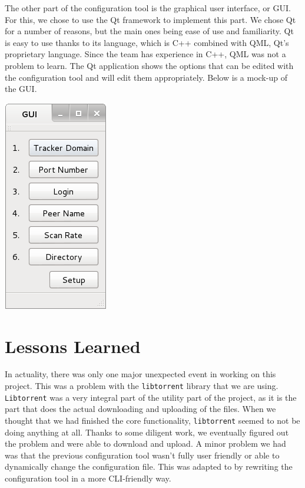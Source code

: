 \documentclass[12 pt]{article}
\begin{document}
	The other part of the configuration tool is the graphical user interface, or GUI. For this, we chose to use the Qt framework to implement this part. We chose Qt for a number of reasons, but the main ones being ease of use and familiarity. Qt is easy to use thanks to its language, which is C++ combined with QML, Qt's proprietary language. Since the team has experience in C++, QML was not a problem to learn. The Qt application shows the options that can be edited with the configuration tool and will edit them appropriately. Below is a mock-up of the GUI.
	
	\begin{center}
\includegraphics[width=0.4\linewidth]{GUI}
\end{center}

	
	\section{Lessons Learned}
	
	In actuality, there was only one major unexpected event in working on this project. This was a problem with the \texttt{libtorrent} library that we are using. \texttt{Libtorrent} was a very integral part of the utility part of the project, as it is the part that does the actual downloading and uploading of the files. When we thought that we had finished the core functionality, \texttt{libtorrent} seemed to not be doing anything at all. Thanks to some diligent work, we eventually figured out the problem and were able to download and upload. A minor problem we had was that the previous configuration tool wasn't fully user friendly or able to dynamically change the configuration file. This was adapted to by rewriting the configuration tool in a more CLI-friendly way.
	
\end{document}
